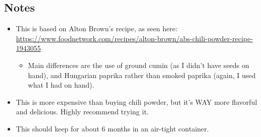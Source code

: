 \begin{multicols}{2}
\subsection*{Notes}
\begin{itemize}
    \item This is based on Alton Brown's recipe, as seen here: \url{https://www.foodnetwork.com/recipes/alton-brown/abs-chili-powder-recipe-1943055}
    \begin{itemize}
        \item Main differences are the use of ground cumin (as I didn't have seeds on hand), and Hungarian paprika rather than smoked paprika (again, I used what I had on hand).
    \end{itemize}
    \item This is more expensive than buying chili powder, but it's WAY more flavorful and delicious. Highly recommend trying it.
    \item This should keep for about 6 months in an air-tight container.
\end{itemize}
\end{multicols}
\clearpage